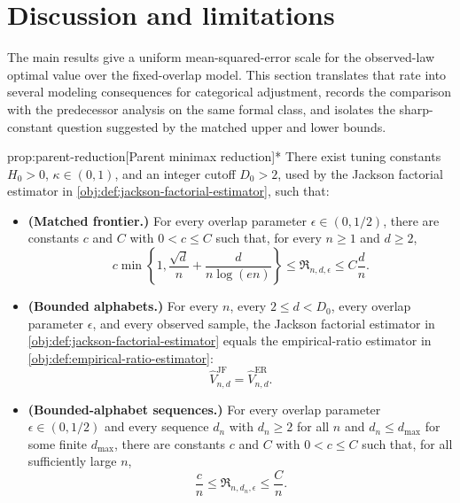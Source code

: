 \section{Discussion and limitations}

The main results give a uniform mean-squared-error scale for the observed-law optimal value over the fixed-overlap model. This section translates that rate into several modeling consequences for categorical adjustment, records the comparison with the predecessor analysis on the same formal class, and isolates the sharp-constant question suggested by the matched upper and lower bounds.

\begin{propositionv}{prop:parent-reduction}[Parent minimax reduction]*
There exist tuning constants \(H_0>0\), \(\kappa\in(0,1)\), and an integer cutoff \(D_0>2\), used by the Jackson factorial estimator in \cref{obj:def:jackson-factorial-estimator}, such that:
\begin{itemize}
\item \textbf{(Matched frontier.)} For every overlap parameter \(\epsilon\in(0,1/2)\), there are constants \(c\) and \(C\) with \(0<c\leq C\) such that, for every \(n\geq1\) and \(d\geq2\),
\[
c\min\left\{1,\frac{\sqrt d}{n}+\frac{d}{n\log(en)}\right\}
\leq
\mathfrak R_{n,d,\epsilon}
\leq
C\frac{d}{n}.
\]
\item \textbf{(Bounded alphabets.)} For every \(n\), every \(2\leq d<D_0\), every overlap parameter \(\epsilon\), and every observed sample, the Jackson factorial estimator in \cref{obj:def:jackson-factorial-estimator} equals the empirical-ratio estimator in \cref{obj:def:empirical-ratio-estimator}:
\[
\widehat V_{n,d}^{\mathrm{JF}}=\widehat V_{n,d}^{\mathrm{ER}}.
\]
\item \textbf{(Bounded-alphabet sequences.)} For every overlap parameter \(\epsilon\in(0,1/2)\) and every sequence \(d_n\) with \(d_n\geq2\) for all \(n\) and \(d_n\leq d_{\max}\) for some finite \(d_{\max}\), there are constants \(c\) and \(C\) with \(0<c\leq C\) such that, for all sufficiently large \(n\),
\[
\frac{c}{n}
\leq
\mathfrak R_{n,d_n,\epsilon}
\leq
\frac{C}{n}.
\]
\end{itemize}
\end{propositionv}

